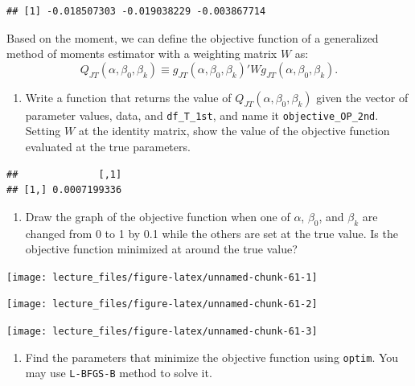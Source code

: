 \documentclass[
]{book}
\providecommand{\tightlist}{%
  \setlength{\itemsep}{0pt}\setlength{\parskip}{0pt}}
\begin{document}
\begin{verbatim}
## [1] -0.018507303 -0.019038229 -0.003867714
\end{verbatim}

Based on the moment, we can define the objective function of a generalized method of moments estimator with a weighting matrix \(W\) as:
\[
Q_{JT}(\alpha, \beta_0, \beta_k) \equiv g_{JT}(\alpha, \beta_0, \beta_k)' W g_{JT}(\alpha, \beta_0, \beta_k).
\]

\begin{enumerate}
\def\labelenumi{\arabic{enumi}.}
\setcounter{enumi}{6}
\tightlist
\item
  Write a function that returns the value of \(Q_{JT}(\alpha, \beta_0, \beta_k)\) given the vector of parameter values, data, and \texttt{df\_T\_1st}, and name it \texttt{objective\_OP\_2nd}. Setting \(W\) at the identity matrix, show the value of the objective function evaluated at the true parameters.
\end{enumerate}

\begin{verbatim}
##              [,1]
## [1,] 0.0007199336
\end{verbatim}

\begin{enumerate}
\def\labelenumi{\arabic{enumi}.}
\setcounter{enumi}{7}
\tightlist
\item
  Draw the graph of the objective function when one of \(\alpha\), \(\beta_0\), and \(\beta_k\) are changed from 0 to 1 by 0.1 while the others are set at the true value. Is the objective function minimized at around the true value?
\end{enumerate}

\begin{center}\texttt{[image: lecture\_files/figure-latex/unnamed-chunk-61-1]} \end{center}

\begin{center}\texttt{[image: lecture\_files/figure-latex/unnamed-chunk-61-2]} \end{center}

\begin{center}\texttt{[image: lecture\_files/figure-latex/unnamed-chunk-61-3]} \end{center}

\begin{enumerate}
\def\labelenumi{\arabic{enumi}.}
\setcounter{enumi}{8}
\tightlist
\item
  Find the parameters that minimize the objective function using \texttt{optim}. You may use \texttt{L-BFGS-B} method to solve it.
\end{enumerate}
\end{document}
